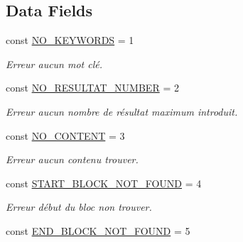 \subsection*{Data Fields}
\begin{DoxyCompactItemize}
\item 
\hypertarget{class_generic_images_downloader_a3982e7af9d3327658dc69aec5fbee4d4}{const \hyperlink{class_generic_images_downloader_a3982e7af9d3327658dc69aec5fbee4d4}{N\-O\-\_\-\-K\-E\-Y\-W\-O\-R\-D\-S} = 1}\label{class_generic_images_downloader_a3982e7af9d3327658dc69aec5fbee4d4}

\begin{DoxyCompactList}\small\item\em Erreur aucun mot clé. \end{DoxyCompactList}\item 
\hypertarget{class_generic_images_downloader_a2ab25e02418e0ec9055aa6d8cfe25383}{const \hyperlink{class_generic_images_downloader_a2ab25e02418e0ec9055aa6d8cfe25383}{N\-O\-\_\-\-R\-E\-S\-U\-L\-T\-A\-T\-\_\-\-N\-U\-M\-B\-E\-R} = 2}\label{class_generic_images_downloader_a2ab25e02418e0ec9055aa6d8cfe25383}

\begin{DoxyCompactList}\small\item\em Erreur aucun nombre de résultat maximum introduit. \end{DoxyCompactList}\item 
\hypertarget{class_generic_images_downloader_a402bb789cf5cda26705e575ff3f84072}{const \hyperlink{class_generic_images_downloader_a402bb789cf5cda26705e575ff3f84072}{N\-O\-\_\-\-C\-O\-N\-T\-E\-N\-T} = 3}\label{class_generic_images_downloader_a402bb789cf5cda26705e575ff3f84072}

\begin{DoxyCompactList}\small\item\em Erreur aucun contenu trouver. \end{DoxyCompactList}\item 
\hypertarget{class_generic_images_downloader_a5addbab3d5ba0a46bac11e752aff34f3}{const \hyperlink{class_generic_images_downloader_a5addbab3d5ba0a46bac11e752aff34f3}{S\-T\-A\-R\-T\-\_\-\-B\-L\-O\-C\-K\-\_\-\-N\-O\-T\-\_\-\-F\-O\-U\-N\-D} = 4}\label{class_generic_images_downloader_a5addbab3d5ba0a46bac11e752aff34f3}

\begin{DoxyCompactList}\small\item\em Erreur début du bloc non trouver. \end{DoxyCompactList}\item 
\hypertarget{class_generic_images_downloader_a72cb2b05f3c0320f799874ba521128b3}{const \hyperlink{class_generic_images_downloader_a72cb2b05f3c0320f799874ba521128b3}{E\-N\-D\-\_\-\-B\-L\-O\-C\-K\-\_\-\-N\-O\-T\-\_\-\-F\-O\-U\-N\-D} = 5}\label{class_generic_images_downloader_a72cb2b05f3c0320f799874ba521128b3}


\end{DoxyCompactItemize}
